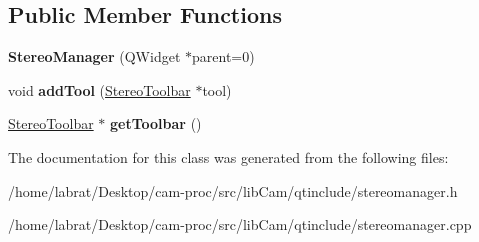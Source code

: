 \subsection*{Public Member Functions}
\begin{DoxyCompactItemize}
\item 
{\bfseries Stereo\+Manager} (Q\+Widget $\ast$parent=0)\hypertarget{classStereoManager_ae18d7fe168e7e946dda826dacbd02c62}{}\label{classStereoManager_ae18d7fe168e7e946dda826dacbd02c62}

\item 
void {\bfseries add\+Tool} (\hyperlink{classStereoToolbar}{Stereo\+Toolbar} $\ast$tool)\hypertarget{classStereoManager_ad412e07427c994213fb249730fc5c881}{}\label{classStereoManager_ad412e07427c994213fb249730fc5c881}

\item 
\hyperlink{classStereoToolbar}{Stereo\+Toolbar} $\ast$ {\bfseries get\+Toolbar} ()\hypertarget{classStereoManager_a88d462501c53facc305011ebd4d62df5}{}\label{classStereoManager_a88d462501c53facc305011ebd4d62df5}

\end{DoxyCompactItemize}


The documentation for this class was generated from the following files\+:\begin{DoxyCompactItemize}
\item 
/home/labrat/\+Desktop/cam-\/proc/src/lib\+Cam/qtinclude/stereomanager.\+h\item 
/home/labrat/\+Desktop/cam-\/proc/src/lib\+Cam/qtinclude/stereomanager.\+cpp\end{DoxyCompactItemize}
